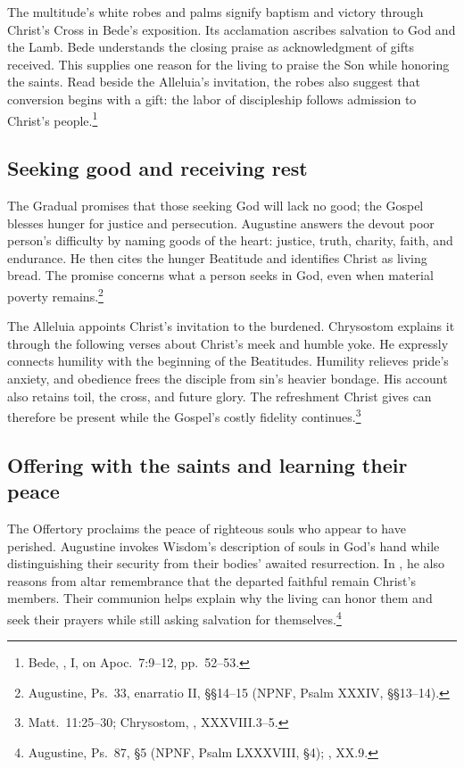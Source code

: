 The multitude's white robes and palms signify baptism and victory through
Christ's Cross in Bede's exposition. Its acclamation ascribes salvation
to God and the Lamb. Bede understands the closing praise as acknowledgment
of gifts received. This supplies one reason for the living to praise the
Son while honoring the saints. Read beside the Alleluia's invitation,
the robes also suggest that conversion begins with a gift: the labor
of discipleship follows admission to Christ's people.\footnote{Bede,
, I, on Apoc.~7:9--12, pp.~52--53.}

\subsection{Seeking good and receiving rest}
The Gradual promises that those seeking God will lack no good; the Gospel
blesses hunger for justice and persecution. Augustine answers the devout
poor person's difficulty by naming goods of the heart: justice, truth,
charity, faith, and endurance. He then cites the hunger Beatitude and
identifies Christ as living bread. The promise concerns what a person
seeks in God, even when material poverty remains.\footnote{Augustine,
Ps.~33, enarratio II, \S\S14--15 (NPNF, Psalm XXXIV,
\S\S13--14).}

The Alleluia appoints Christ's invitation to the burdened. Chrysostom
explains it through the following verses about Christ's meek and humble
yoke. He expressly connects humility with the beginning of the Beatitudes.
Humility relieves pride's anxiety, and obedience frees the disciple from
sin's heavier bondage. His account also retains toil, the cross, and
future glory. The refreshment Christ gives can therefore be present while
the Gospel's costly fidelity continues.\footnote{Matt.~11:25--30;
Chrysostom, , XXXVIII.3--5.}

\subsection{Offering with the saints and learning their peace}
The Offertory proclaims the peace of righteous souls who appear to have
perished. Augustine invokes Wisdom's description of souls in God's hand
while distinguishing their security from their bodies' awaited
resurrection. In , he also reasons from altar
remembrance that the departed faithful remain Christ's members. Their
communion helps explain why the living can honor them and seek their
prayers while still asking salvation for themselves.\footnote{Augustine,
Ps.~87, \S5 (NPNF, Psalm LXXXVIII, \S4);
, XX.9.}


